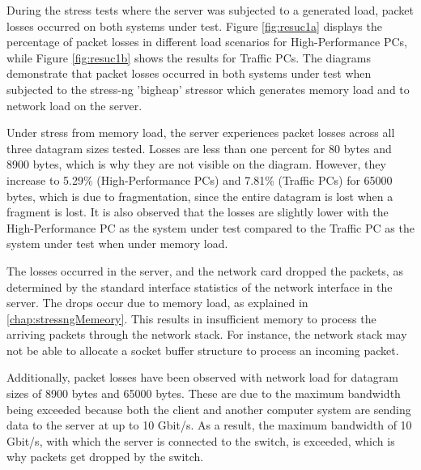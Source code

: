During the stress tests where the server was subjected to a generated load, packet losses occurred on both systems under test. Figure \ref{fig:resuc1a} displays the percentage of packet losses in different load scenarios for High-Performance PCs, while Figure \ref{fig:resuc1b} shows the results for Traffic PCs. The diagrams demonstrate that packet losses occurred in both systems under test when subjected to the stress-ng 'bigheap' stressor which generates memory load and to network load on the server.

Under stress from memory load, the server experiences packet losses across all three datagram sizes tested. Losses are less than one percent for 80 bytes and 8900 bytes, which is why they are not visible on the diagram. However, they increase to 5.29\% (High-Performance PCs) and 7.81\% (Traffic PCs) for 65000 bytes, which is due to fragmentation, since the entire datagram is lost when a fragment is lost. It is also observed that the losses are slightly lower with the High-Performance PC as the system under test compared to the Traffic PC as the system under test when under memory load.

The losses occurred in the server, and the network card dropped the packets, as determined by the standard interface statistics of the network interface in the server. The drops occur due to memory load, as explained in \ref{chap:stressngMemeory}. This results in insufficient memory to process the arriving packets through the network stack. For instance, the network stack may not be able to allocate a socket buffer structure to process an incoming packet.

Additionally, packet losses have been observed with network load for datagram sizes of 8900 bytes and 65000 bytes. These are due to the maximum bandwidth being exceeded because both the client and another computer system are sending data to the server at up to 10 Gbit/s. As a result, the maximum bandwidth of 10 Gbit/s, with which the server is connected to the switch, is exceeded, which is why packets get dropped by the switch.

